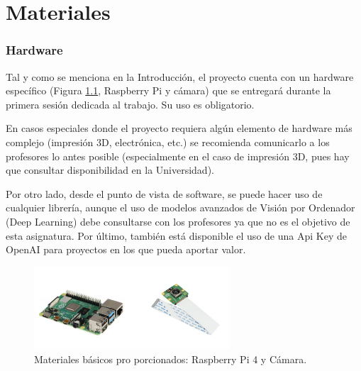 \chapter{\textbf{Materiales}}
\label{chapter:materiales}

\subsection*{Hardware}
{}
\vspace{5mm}

Tal y como se menciona en la Introducción, el proyecto cuenta con un hardware específico (Figura \ref{fig:materials}, Raspberry Pi y cámara) que se entregará durante la primera sesión dedicada al trabajo. Su uso es obligatorio. 

En casos especiales donde el proyecto requiera algún elemento de hardware más complejo (impresión 3D, electrónica, etc.) se recomienda comunicarlo a los profesores lo antes posible (especialmente en el caso de impresión 3D, pues hay que consultar disponibilidad en la Universidad).

Por otro lado, desde el punto de vista de software, se puede hacer uso de cualquier librería, aunque el uso de modelos avanzados de Visión por Ordenador (Deep Learning) debe consultarse con los profesores ya que no es el objetivo de esta asignatura. Por último, también está disponible el uso de una Api Key de OpenAI para proyectos en los que pueda aportar valor.

\begin{figure}[H]
    \centering
    \includegraphics[width=0.65\textwidth]{Lab_Project/template/figures/materials.png}
    \caption{Materiales básicos pro porcionados: Raspberry Pi 4 y Cámara.}
    \label{fig:materials}
\end{figure}
